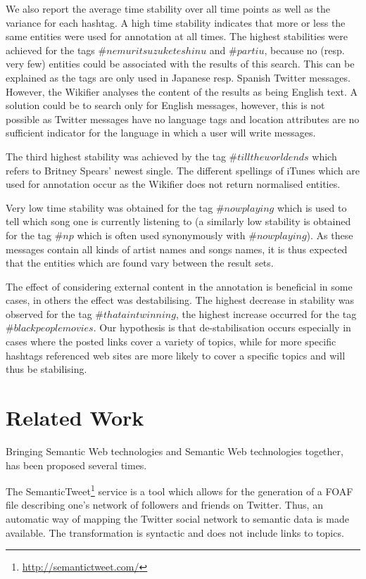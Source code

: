 \documentclass{llncs}
\begin{document}
We also report the average time stability over all time points as well as the variance for each hashtag. A high time stability indicates that more or less the same entities were used for annotation at all times. The highest stabilities were achieved for the tags $\#nemuritsuzuketeshinu$ and $\#partiu$, because no (resp. very few) entities could be associated with the results of this search. This can be explained as the tags are only used in Japanese resp. Spanish Twitter messages. However, the Wikifier analyses the content of the results as being English text. A solution could be to search only for English messages, however, this is not possible as Twitter messages have no language tags and location attributes are no sufficient indicator for the language in which a user will write messages.

The third highest stability was achieved by the tag $\#tilltheworldends$ which refers to Britney Spears' newest single. The different spellings of iTunes which are used for annotation occur as the Wikifier does not return normalised entities.

Very low time stability was obtained for the tag $\#nowplaying$ which is used to tell which song one is currently listening to (a similarly low stability is obtained for the tag $\#np$ which is often used synonymously with $\#nowplaying$). As these messages contain all kinds of artist names and songs names, it is thus expected that the entities which are found vary between the result sets.

The effect of considering external content in the annotation is beneficial in some cases, in others the effect was destabilising. The highest decrease in stability was observed for the tag $\#thataintwinning$, the highest increase occurred for the tag $\#blackpeoplemovies$. Our hypothesis is that de-stabilisation occurs especially in cases where the posted links cover a variety of topics, while for more specific hashtags referenced web sites are more likely to cover a specific topics and will thus be stabilising.

\section{Related Work}
\label{sect:relWork}

Bringing Semantic Web technologies and Semantic Web technologies together, has been proposed several times.

The SemanticTweet\footnote{\url{http://semantictweet.com/}} service is a tool which allows for the generation of a FOAF file describing one's network of followers and friends on Twitter. Thus, an automatic way of mapping the Twitter social network to semantic data is made available. The transformation is syntactic and does not include links to topics.
\end{document}
